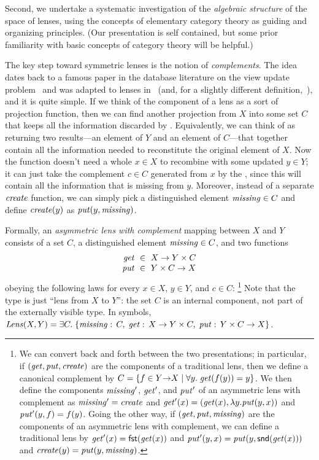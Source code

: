 Second, we undertake a systematic investigation of the {\em
  algebraic structure} of the space of lenses, using the concepts of
elementary category theory as guiding and organizing principles.  (Our
presentation is self contained, but some prior familiarity
with basic concepts of category theory will be helpful.)

The key  step toward symmetric lenses is the notion
of {\em complements}.  The idea dates back to a famous paper in the
database literature on the view update
problem~\cite{DBLP:journals/tods/BancilhonS81} and was adapted to
lenses in~\cite{Matching10} (and, for a slightly different
definition,~\cite{matsuda2007btb}), and it is quite simple.  If we think of
the    
\GET{} component of a lens as a sort of projection function, then we can find
another projection from $X$ into some set $C$ that
keeps all the information discarded by \GET{}.  Equivalently, we can think
of \GET{} as returning two results---an element of $Y$ and an element of
$C$---that together contain all the information needed to reconstitute the
original element of $X$.  Now the \PUT{} function doesn't need a whole $x\in
X$ to recombine with some updated $y\in Y$; it can
just take the complement $c\in C$ generated from $x$ by the \GET, since this
will 
contain all the information that is missing from $y$.  Moreover, instead of
a separate
$\mathit{create}$ function, we can simply pick a distinguished element
$\mathit{missing}\in C$ and define $\mathit{create}(y)$ as $\mathit{put}(y,\mathit{missing})$.

Formally, an {\em asymmetric lens with complement}
mapping between $X$ and $Y$ consists of a set $C$, a
distinguished element $\mathit{missing} \in C$, and two functions
\[
\begin{array}{r@{\ \;}c@{\ \;}l}
\GET &\in& X \arrow Y \times C\\
\PUT &\in& Y \times C \arrow X
\end{array}
\]
obeying the following laws for every $x \in X$, $y \in Y$, and $c \in C$:%
\footnote{We can convert back and
forth between the two presentations; in particular, if $(\mathit{get}, \mathit{put},
\mathit{create})$ are the components of a traditional lens, then we define a
canonical complement by $C=\{f\in Y{\rightarrow}X\mid \forall
y.\;\mathit{get}(f(y))=y\}$. We then define the components $\mathit{missing}'$, $\mathit{get}'$, and
$\mathit{put}'$ 
of an asymmetric lens with complement as $\mathit{missing}'=\mathit{create}$ and
$\mathit{get}'(x)=(\mathit{get}(x),\lambda y.\mathit{put}(y,x))$ and $\mathit{put}'(y,f)=f(y)$.
\iffull
Going the other way, if $(\mathit{get}, \mathit{put}, \mathit{missing})$ are the components of an
asymmetric lens with complement, we can define a traditional lens by
$\mathit{get}'(x) = \mathsf{fst}(\mathit{get}(x))$ and $\mathit{put}'(y,x) = \mathit{put}(y,\mathsf{snd}(\mathit{get}(x)))$
and $\mathit{create}(y) = \mathit{put}(y,\mathit{missing})$.
\fi
}
%
Note that the type is just ``lens from $X$ to $Y$'': the set
$C$ is an internal component, not part of the externally visible type.
In symbols, $ \mathit{Lens}(X,Y) =
\exists C.\; \{ \mathord{\mathit{missing}}:\, C,\; \mathit{get}:\,X \rightarrow Y
\times C,\; \mathit{put}:\,Y \times C \rightarrow X \}$.

